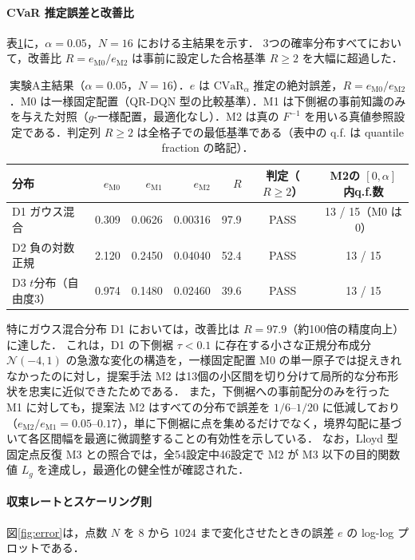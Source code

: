 \documentclass[a4paper,10pt]{jsarticle}
\theoremstyle{definition}
\newcommand{\CVaR}{\mathrm{CVaR}}
\renewcommand{\Finv}{F^{-1}}
\begin{document}
\paragraph{CVaR 推定誤差と改善比}
表\ref{tab:A1}に，$\alpha=0.05$，$N=16$ における主結果を示す．
3つの確率分布すべてにおいて，改善比 $R = e_{\mathrm{M0}} / e_{\mathrm{M2}}$ は事前に設定した合格基準 $R \ge 2$ を大幅に超過した．

\begin{table}[htbp]
\centering
\caption{実験A主結果（$\alpha=0.05$，$N=16$）．$e$ は $\CVaR_\alpha$ 推定の絶対誤差，$R=e_{\mathrm{M0}}/e_{\mathrm{M2}}$．M0 は一様固定配置（QR-DQN 型の比較基準）．M1 は下側裾の事前知識のみを与えた対照（$g$-一様配置，最適化なし）．M2 は真の $\Finv$ を用いる真値参照設定である．判定列 $R\ge2$ は全格子での最低基準である（表中の q.f. は quantile fraction の略記）．}
\label{tab:A1}
\small
\setlength{\tabcolsep}{5pt}
\begin{tabular}{lrrrrcc}
\toprule
分布 & $e_{\mathrm{M0}}$ & $e_{\mathrm{M1}}$ & $e_{\mathrm{M2}}$ & $R$ & 判定（$R\ge2$） & M2の $[0,\alpha]$ 内q.f.数\\
\midrule
D1 ガウス混合 & 0.309 & 0.0626 & 0.00316 & 97.9 & PASS & 13 / 15（M0 は 0）\\
D2 負の対数正規 & 2.120 & 0.2450 & 0.04040 & 52.4 & PASS & 13 / 15\\
D3 $t$分布（自由度3） & 0.974 & 0.1480 & 0.02460 & 39.6 & PASS & 13 / 15\\
\bottomrule
\end{tabular}
\end{table}

特にガウス混合分布 D1 においては，改善比は $R = 97.9$（約100倍の精度向上）に達した．
これは，D1 の下側裾 $\tau < 0.1$ に存在する小さな正規分布成分 $\mathcal{N}(-4, 1)$ の急激な変化の構造を，一様固定配置 M0 の単一原子では捉えきれなかったのに対し，提案手法 M2 は13個の小区間を切り分けて局所的な分布形状を忠実に近似できたためである．
また，下側裾への事前配分のみを行った M1 に対しても，提案法 M2 はすべての分布で誤差を $1/6$--$1/20$ に低減しており（$e_{\mathrm{M2}}/e_{\mathrm{M1}} = 0.05$--$0.17$），単に下側裾に点を集めるだけでなく，境界勾配に基づいて各区間幅を最適に微調整することの有効性を示している．
なお，Lloyd 型固定点反復 M3 との照合では，全54設定中46設定で M2 が M3 以下の目的関数値 $L_g$ を達成し，最適化の健全性が確認された．

\paragraph{収束レートとスケーリング則}
図\ref{fig:error}は，点数 $N$ を $8$ から $1024$ まで変化させたときの誤差 $e$ の log-log プロットである．
\end{document}
